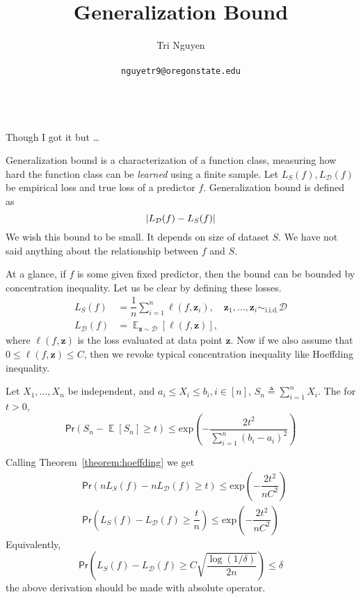 \documentclass[11pt,a4paper]{article}
\title{Generalization Bound}
\author{	Tri Nguyen \\\\
        \texttt{nguyetr9@oregonstate.edu} \\\\
        }
\begin{document}
\maketitle

Though I got it but \ldots 

Generalization bound is a characterization of a function class, measuring how hard the function class can be \textit{learned} using a finite sample.
Let $L_{S}(f), L_{\mathcal{D}}(f)$ be empirical loss and true loss of a predictor $f$. Generalization bound is defined as
\[
\left\lvert L_{\mathcal{D}}(f) - L_{S}(f)\right\rvert
\] 
We wish this bound to be small. It depends on size of dataset $S$. We have not said anything about the relationship between $f$ and $S$.

At a glance, if $f$ is some given fixed predictor, then the bound can be bounded by concentration inequality. Let us be clear by defining these losses.
\begin{align*}
    L_S(f) &= \dfrac{1}{n} \sum^{n}_{i=1} \ell (f, \bm{z}_i), \quad \bm{z}_1, \ldots , \bm{z}_i \sim_{\text{i.i.d.}} \mathcal{D} \\
    L_{\mathcal{D}}(f) &= \mathop{\mathbb{E}}_{\bm{z} \sim \mathcal{D}} \left[ \ell (f, \bm{z}) \right],
\end{align*} 
where $\ell (f, \bm{z})$ is the loss evaluated at data point $\bm{z}$. Now if we also assume that $0\leq \ell (f, \bm{z}) \leq C$, then we revoke typical concentration inequality like Hoeffding inequality.

\begin{theorem}
    \label{theorem:hoeffding}
    Let $X_1, \ldots , X_n$ be independent, and $a_i \leq X_i \leq b_i, i\in [n]$, $S_n \triangleq \sum^{n}_{i=1} X_i$. The for $t > 0$, 
    \[
    \textsf{Pr}(S_n - \mathop{\mathbb{E}}[S_n] \geq t) \leq \text{exp}\left( -\dfrac{2t^2}{\sum^{n}_{i=1} (b_i - a_i)^2} \right)
    \] 
\end{theorem}
Calling Theorem~\ref{theorem:hoeffding} we get
\begin{align*}
&\textsf{Pr}(nL_S(f) - nL_{\mathcal{D}}(f) \geq t) \leq \text{exp} \left( -\dfrac{2t^2}{nC^2} \right) \\
&\textsf{Pr}(L_S(f) - L_{\mathcal{D}}(f) \geq \dfrac{t}{n}) \leq \text{exp} \left( -\dfrac{2t^2}{nC^2} \right) 
\end{align*} 
Equivalently, 
\begin{equation}
\label{eq:pitfall1}
\textsf{Pr}\left(L_S(f) - L_{\mathcal{D}}(f) \geq C\sqrt{\dfrac{\log (1/\delta)}{2n}}\right) \leq \delta 
\end{equation} 
{\red the above derivation should be made with absolute operator.}
\end{document}
